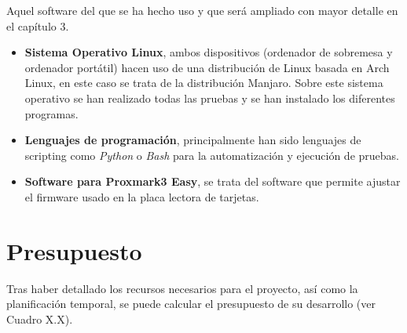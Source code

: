 Aquel software del que se ha hecho uso y que será ampliado con mayor detalle en el capítulo 3.

\begin{itemize}
  \item \textbf{Sistema Operativo Linux}, ambos dispositivos (ordenador de sobremesa y ordenador portátil) hacen uso de
    una distribución de Linux basada en Arch Linux, en este caso se trata de la distribución Manjaro. Sobre este
    sistema operativo se han realizado todas las pruebas y se han instalado los diferentes programas.
  \item \textbf{Lenguajes de programación}, principalmente han sido lenguajes de scripting como \textit{Python} o
    \textit{Bash} para la automatización y ejecución de pruebas.
  \item \textbf{Software para Proxmark3 Easy}, se trata del software que permite ajustar el firmware usado en la placa 
    lectora de tarjetas.
\end{itemize}

\section{Presupuesto}

Tras haber detallado los recursos necesarios para el proyecto, así como la planificación temporal, se puede calcular
el presupuesto de su desarrollo (ver Cuadro X.X).


